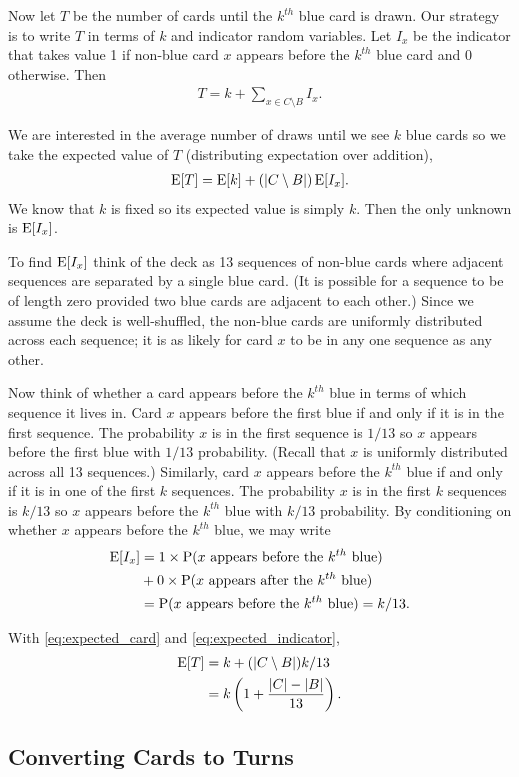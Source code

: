 Now let $T$ be the number of cards until
the $k^{th}$ blue card is drawn.
Our strategy is to write $T$ in terms of $k$
and indicator random variables.
Let $I_x$ be the indicator that takes value 1
if non-blue card $x$ appears before the $k^{th}$ blue card
and 0 otherwise.
Then
\begin{align}
    T = k + \sum_{x \in C \setminus B} I_x. \nonumber
\end{align}

We are interested in the average number of draws
until we see $k$ blue cards
so we take the expected value of $T$
(distributing expectation over addition),
\begin{align} \label{eq:expected_card}
    \operatorname{\mathrm{E}}[T] = \operatorname{\mathrm{E}}[k] + (|C \setminus B|) \operatorname{\mathrm{E}}[I_x].
\end{align}
We know that $k$ is fixed so its expected value is simply $k$.
Then the only unknown is $\operatorname{\mathrm{E}}[I_x]$.

To find $\operatorname{\mathrm{E}}[I_x]$ think of the deck as 13 sequences 
of non-blue cards where adjacent sequences are
separated by a single blue card.
(It is possible for a sequence to be of length zero provided
two blue cards are adjacent to each other.)
Since we assume the deck is well-shuffled, the non-blue cards
are uniformly distributed across each sequence;
it is as likely for card $x$ to be in any one sequence
as any other.

Now think of whether a card appears before the $k^{th}$ blue
in terms of which sequence it lives in.
Card $x$ appears before the first blue if and only if it is 
in the first sequence.
The probability $x$ is in the first sequence is $1/13$
so $x$ appears before the first blue with $1/13$ probability.
(Recall that $x$ is uniformly distributed across all
13 sequences.)
Similarly, card $x$ appears before the $k^{th}$ blue if and only if
it is in one of the first $k$ sequences.
The probability $x$ is in the first $k$ sequences is $k/13$
so $x$ appears before the $k^{th}$ blue with $k/13$ probability.
By conditioning on whether $x$ appears before the $k^{th}$ blue,
we may write
\begin{align} \label{eq:expected_indicator}
    \operatorname{\mathrm{E}}[I_x] &= 1 \times 
    \operatorname{\mathrm{P}}(\textrm{$x$ appears before the $k^{th}$ blue}) \nonumber \\
    &+ 0 \times \operatorname{\mathrm{P}}(\textrm{$x$ appears after the $k^{th}$ blue})
    \nonumber \\
    &= \operatorname{\mathrm{P}}(\textrm{$x$ appears before the $k^{th}$ blue})
    = k/13.
\end{align}

With \cref{eq:expected_card} and \cref{eq:expected_indicator},
\begin{align}
    \operatorname{\mathrm{E}}[T] &= k + (|C \setminus B|) k/13 \nonumber \\
    &= k \left(1 + \frac{|C| - |B|}{13}\right). \nonumber
\end{align}

\subsection{Converting Cards to Turns}\label{sec:converting}